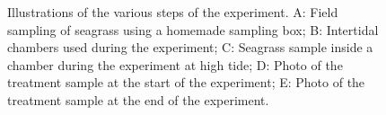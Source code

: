\documentclass[
  number]{elsarticle}
\begin{document}
\label{cell-fig-design}
\begin{figure}[H]


\caption{\label{fig-design}Illustrations of the various steps of the
experiment. A: Field sampling of seagrass using a homemade sampling box;
B: Intertidal chambers used during the experiment; C: Seagrass sample
inside a chamber during the experiment at high tide; D: Photo of the
treatment sample at the start of the experiment; E: Photo of the
treatment sample at the end of the experiment.}

\end{figure}%
\end{document}
